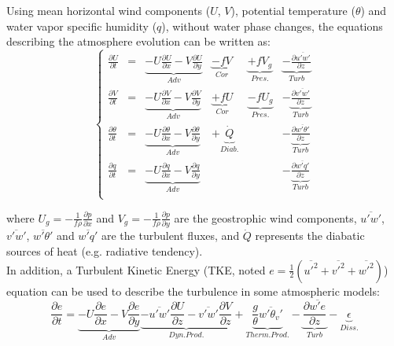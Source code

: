 Using mean horizontal wind components ($U$, $V$), potential temperature ($\theta$) and water vapor specific humidity ($q$), without water phase changes, the equations describing the atmosphere evolution can be written as:
\begin{equation}
\left\{
\begin{array}{llllll}
\frac{\partial U}{\partial t} &=&\underbrace{- U\frac{\partial U}{\partial x} - V\frac{\partial U}{\partial y}}_{Adv}& \underbrace{-fV}_{Cor} &\underbrace{+fV_g}_{Pres.} & \underbrace{-\frac{\partial\overline{u'w'}}{\partial z}}_{Turb} \\
\frac{\partial V}{\partial t} &=&\underbrace{- U\frac{\partial V}{\partial x} - V\frac{\partial V}{\partial y}}_{Adv}& \underbrace{+fU}_{Cor}&\underbrace{-fU_g}_{Pres.} & -\underbrace{\frac{\partial\overline{v'w'}}{\partial z}}_{Turb}\\
\frac{\partial \theta}{\partial t} &=&\underbrace{- U\frac{\partial \theta}{\partial x} - V\frac{\partial \theta}{\partial y}}_{Adv}& + \underbrace{\dot{Q}}_{Diab.}  && -\underbrace{\frac{\partial\overline{w'\theta'}}{\partial z}}_{Turb} \\
\frac{\partial q}{\partial t} &=&\underbrace{- U\frac{\partial q}{\partial x} - V\frac{\partial q}{\partial y}}_{Adv}&  && -\underbrace{\frac{\partial\overline{w'q'}}{\partial z}}_{Turb} \\
\end{array}
\right.
\end{equation}


where $U_g=-\frac{1}{f\rho}\frac{\partial p}{\partial x}$ and $V_g=-\frac{1}{f\rho}\frac{\partial p}{\partial y}$ are the geostrophic wind components, $\overline{u'w'}$, $\overline{v'w'}$, $\overline{w'\theta'}$ and $\overline{w'q'}$ are the turbulent fluxes, and $\dot{Q}$ represents the diabatic sources of heat (e.g. radiative tendency). \\

In addition, a Turbulent Kinetic Energy (TKE, noted $e=\frac{1}{2}(\overline{u'^2}+\overline{v'^2}+\overline{w'^2})$) equation can be used to describe the turbulence in some atmospheric models:
\begin{equation}
\frac{\partial e}{\partial t} =\underbrace{- U\frac{\partial e}{\partial x} - V\frac{\partial e}{\partial y}}_{Adv} \underbrace{- \overline{u'w'}\frac{\partial U}{\partial z} - \overline{v'w'}\frac{\partial V}{\partial z}}_{Dyn. Prod.} +\underbrace{ \frac{g}{\theta}\overline{w'\theta_v'}}_{Therm. Prod.} - \underbrace{\frac{\partial \overline{w'e}}{\partial z}}_{Turb} -\underbrace{\epsilon}_{Diss.}
\end{equation}

